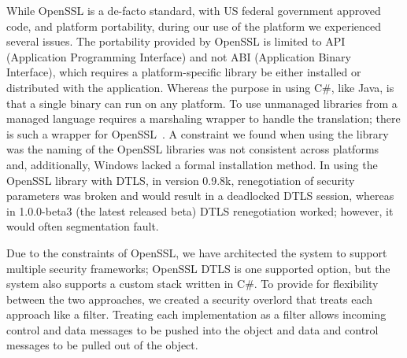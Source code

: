 \documentclass[conference]{IEEEtran}
\begin{document}
While OpenSSL is a de-facto standard, with US federal government approved code, and 
platform portability, during our use of the platform we experienced several
issues.  The portability provided by OpenSSL is limited to API (Application
Programming Interface) and not ABI (Application Binary Interface), which
requires a platform-specific library be either installed or distributed with
the application.  Whereas the purpose in using C\#, like Java, is that a single
binary can run on any platform.  To use unmanaged libraries from a managed
language requires a marshaling wrapper to handle the translation; there is
such a wrapper for OpenSSL~\cite{openssl.net}.  A constraint we found when
using the library was the naming of the OpenSSL libraries was not consistent
across platforms and, additionally, Windows lacked a formal installation method.
In using the OpenSSL library with DTLS, in version 0.9.8k, renegotiation of
security parameters  was broken and would result in a deadlocked DTLS session,
whereas in 1.0.0-beta3 (the latest released beta) DTLS renegotiation worked;
however, it would often segmentation fault.

Due to the constraints of OpenSSL, we have architected the system to support
multiple security frameworks; OpenSSL DTLS is one supported option, but the
system also supports a custom stack written in C\#.  To provide for flexibility
between the two approaches, we created a security overlord that treats each
approach like a filter.  Treating each implementation as a filter allows
incoming control and data messages to be pushed into the object and data and
control messages to be pulled out of the object.

\end{document}
